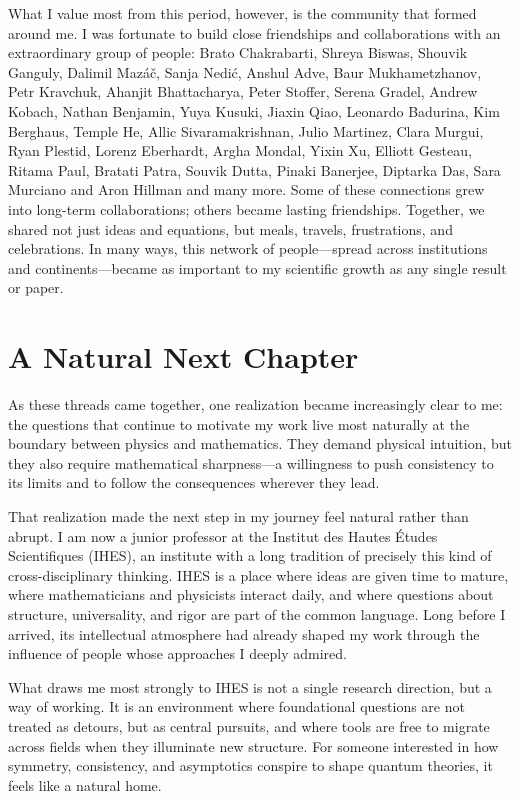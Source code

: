 \documentclass[11pt, oneside]{article}
\begin{document}
What I value most from this period, however, is the community that formed around me. I was fortunate
to build close friendships and collaborations with an extraordinary group of people: Brato Chakrabarti, Shreya Biswas, Shouvik
Ganguly,  Dalimil
Maz\'a\v{c}, Sanja Nedi\'c, Anshul Adve, Baur Mukhametzhanov, Petr Kravchuk, Ahanjit Bhattacharya, Peter Stoffer, Serena Gradel, Andrew Kobach,
Nathan Benjamin, Yuya Kusuki,  Jiaxin Qiao, Leonardo Badurina, Kim Berghaus, Temple
He, Allic Sivaramakrishnan, Julio Martinez, Clara Murgui, Ryan Plestid, Lorenz Eberhardt, Argha Mondal, Yixin Xu,  Elliott Gesteau, Ritama Paul, Bratati Patra, Souvik Dutta, Pinaki Banerjee, Diptarka Das,  Sara Murciano and Aron Hillman and many more. Some of these
connections grew into long-term collaborations; others became lasting friendships. Together, we
shared not just ideas and equations, but meals, travels, frustrations, and celebrations. In many
ways, this network of people—spread across institutions and continents—became as important to my
scientific growth as any single result or paper.



\section*{A Natural Next Chapter}


As these threads came together, one realization became increasingly clear to me: the questions that
continue to motivate my work live most naturally at the boundary between physics and mathematics.
They demand physical intuition, but they also require mathematical sharpness—a willingness to push
consistency to its limits and to follow the consequences wherever they lead.



That realization made the next step in my journey feel natural rather than abrupt. I am now a junior
professor at the Institut des Hautes \'Etudes Scientifiques (IHES), an institute with a long tradition of
precisely this kind of cross-disciplinary thinking. IHES is a place where ideas are given time to mature,
where mathematicians and physicists interact daily, and where questions about structure, universality,
and rigor are part of the common language. Long before I arrived, its intellectual atmosphere had already
shaped my work through the influence of people whose approaches I deeply admired.



What draws me most strongly to IHES is not a single research direction, but a way of working. It is an
environment where foundational questions are not treated as detours, but as central pursuits, and where
tools are free to migrate across fields when they illuminate new structure. For someone interested in how
symmetry, consistency, and asymptotics conspire to shape quantum theories, it feels like a natural home.
\end{document}
